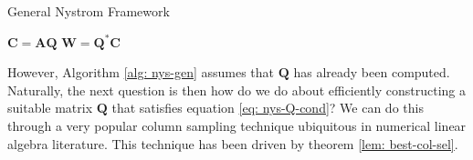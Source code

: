 {\centering
\begin{minipage}{.85\linewidth}
    \begin{algorithm}[H]
        \caption{General Nystrom Framework}
        \label{alg: nys-gen}
        \SetAlgoLined
        \DontPrintSemicolon

        \BlankLine
        $\bm{C} = \bm{A} \bm{Q}$\;
        $\bm{W} = \bm{Q}^{\ast} \bm{C}$\;
        \BlankLine
    \end{algorithm}
\end{minipage}
\par}

However, Algorithm \ref{alg: nys-gen} assumes that $\bm{Q}$ has already been computed. Naturally, the next question is then how do we do about efficiently constructing a suitable matrix $\bm{Q}$ that satisfies equation \ref{eq: nys-Q-cond}? We can do this through a very popular column sampling technique ubiquitous in numerical linear algebra literature. This technique has been driven by theorem \ref{lem: best-col-sel}.

